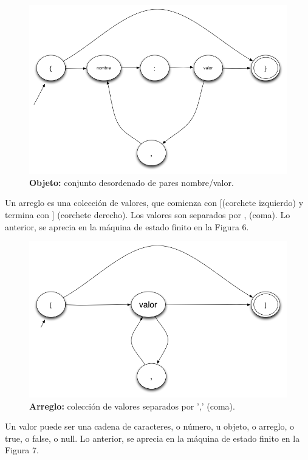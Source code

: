 \begin{figure}[H]
\centering
\includegraphics[scale=0.50]{images/capitulo3/afd1.png}
\caption{\textbf{Objeto:} conjunto desordenado de pares nombre/valor.}
\label{objeto}
\end{figure}

Un arreglo es una colección de valores, que comienza con [(corchete izquierdo) y termina con ] (corchete derecho). Los valores son separados por , (coma). Lo anterior, se aprecia en la máquina de estado finito en la Figura 6.\\

\begin{figure}[H]
\centering
\includegraphics[scale=0.50]{images/capitulo3/afd2.png}
\caption{\textbf{Arreglo:} colección de valores separados por ',' (coma).}
\label{arreglo}
\end{figure}

Un valor puede ser una cadena de caracteres, o número, u objeto, o arreglo, o true, o false, o null.  Lo anterior, se aprecia en la máquina de estado finito en la Figura 7.\\

